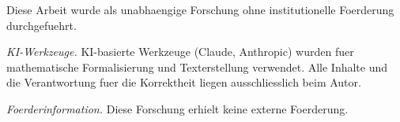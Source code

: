 \documentclass[aps,prd,twocolumn,superscriptaddress,nofootinbib]{revtex4-2}
\theoremstyle{definition}
\theoremstyle{remark}
\begin{document}
\begin{acknowledgments}
Diese Arbeit wurde als unabhaengige Forschung ohne institutionelle Foerderung durchgefuehrt.

\textit{KI-Werkzeuge.} KI-basierte Werkzeuge (Claude, Anthropic) wurden fuer mathematische Formalisierung und Texterstellung verwendet. Alle Inhalte und die Verantwortung fuer die Korrektheit liegen ausschliesslich beim Autor.

\textit{Foerderinformation.} Diese Forschung erhielt keine externe Foerderung.
\end{acknowledgments}


\end{document}
